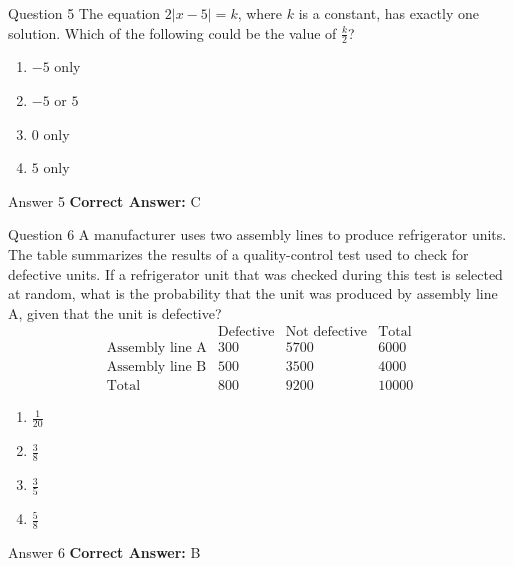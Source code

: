 \documentclass{beamer}
\begin{document}
\begin{frame}{Question 5}
\small
The equation \(2|x-5|=k\), where \(k\) is a constant, has exactly one solution.
Which of the following could be the value of \(\frac{k}{2}\)?
\vspace{0.35cm}
\begin{enumerate}
    \item[A.] \(-5\) only
    \item[B.] \(-5\) or \(5\)
    \item[C.] \(0\) only
    \item[D.] \(5\) only
\end{enumerate}
\end{frame}
\begin{frame}{Answer 5}
\small
\textbf{Correct Answer:} C
\end{frame}

\begin{frame}{Question 6}
\small
A manufacturer uses two assembly lines to produce refrigerator units. The table
summarizes the results of a quality-control test used to check for defective
units. If a refrigerator unit that was checked during this test is selected at
random, what is the probability that the unit was produced by assembly line A,
given that the unit is defective?
\[
\begin{array}{c|ccc}
&\text{Defective}&\text{Not defective}&\text{Total}\\ \hline
\text{Assembly line A}&300&5700&6000\\
\text{Assembly line B}&500&3500&4000\\ \hline
\text{Total}&800&9200&10000
\end{array}
\]
\vspace{0.35cm}
\begin{enumerate}
    \item[A.] \(\frac1{20}\)
    \item[B.] \(\frac38\)
    \item[C.] \(\frac35\)
    \item[D.] \(\frac58\)
\end{enumerate}
\end{frame}
\begin{frame}{Answer 6}
\small
\textbf{Correct Answer:} B
\end{frame}
\end{document}
